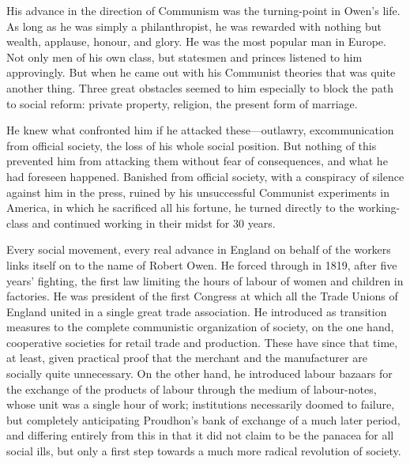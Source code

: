 His advance in the direction of Communism was the turning-point in Owen’s life.
As long as he was simply a philanthropist, he was rewarded with nothing but
wealth, applause, honour, and glory. He was the most popular man in Europe. Not
only men of his own class, but statesmen and princes listened to him
approvingly. But when he came out with his Communist theories that was quite
another thing. Three great obstacles seemed to him especially to block the path
to social reform: private property, religion, the present form of marriage.

He knew what confronted him if he attacked these---outlawry, excommunication
from official society, the loss of his whole social position. But nothing of
this prevented him from attacking them without fear of consequences, and what he
had foreseen happened. Banished from official society, with a conspiracy of
silence against him in the press, ruined by his unsuccessful Communist
experiments in America, in which he sacrificed all his fortune, he turned
directly to the working-class and continued working in their midst for 30 years.

Every social movement, every real advance in England on behalf of the workers
links itself on to the name of Robert Owen. He forced through in 1819, after
five years' fighting, the first law limiting the hours of labour of women and
children in factories. He was president of the first Congress at which all the
Trade Unions of England united in a single great trade association. He
introduced as transition measures to the complete communistic organization of
society, on the one hand, cooperative societies for retail trade and production.
These have since that time, at least, given practical proof that the merchant
and the manufacturer are socially quite unnecessary. On the other hand, he
introduced labour bazaars for the exchange of the products of labour through the
medium of labour-notes, whose unit was a single hour of work; institutions
necessarily doomed to failure, but completely anticipating Proudhon's bank of
exchange of a much later period, and differing entirely from this in that it did
not claim to be the panacea for all social ills, but only a first step towards a
much more radical revolution of society.

